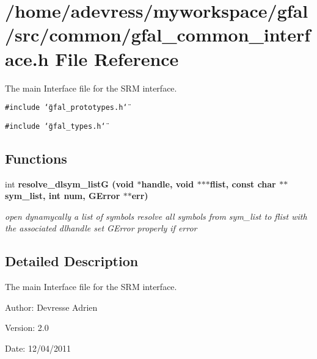 \section{/home/adevress/myworkspace/gfal/src/common/gfal\_\-common\_\-interface.h File Reference}
\label{gfal__common__interface_8h}
The main Interface file for the SRM interface. 

{\tt \#include \char`\"{}gfal\_\-prototypes.h\char`\"{}}\par
{\tt \#include \char`\"{}gfal\_\-types.h\char`\"{}}\par
\subsection*{Functions}
\begin{CompactItemize}
\item 
int \bf{resolve\_\-dlsym\_\-list\-G} (void $\ast$handle, void $\ast$$\ast$$\ast$flist, const char $\ast$$\ast$sym\_\-list, int num, GError $\ast$$\ast$err)\label{gfal__common__interface_8h_0323a4ab58106e316851c1ae06148e28}

\begin{CompactList}\small\item\em open dynamycally a list of symbols resolve all symbols from sym\_\-list to flist with the associated dlhandle set GError properly if error \item\end{CompactList}\end{CompactItemize}


\subsection{Detailed Description}
The main Interface file for the SRM interface. 

\begin{Desc}
\item[Author:]Devresse Adrien \end{Desc}
\begin{Desc}
\item[Version:]2.0 \end{Desc}
\begin{Desc}
\item[Date:]12/04/2011 \end{Desc}

